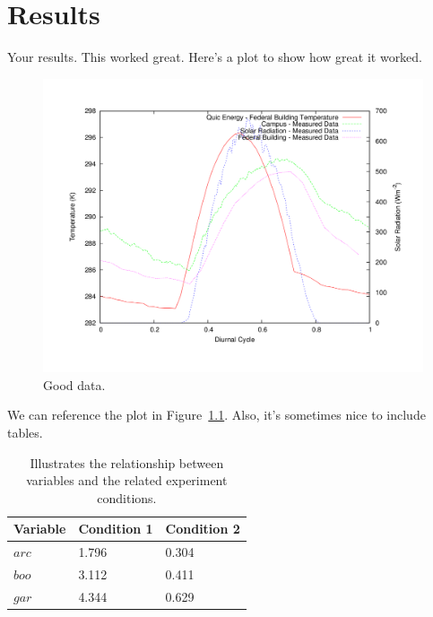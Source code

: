 \chapter{Results}
\label{chap:results}

Your results.  This worked great.  Here's a plot to show how great it worked.  


\begin{figure}
\centering
\includegraphics[width=0.8\linewidth]{images/goodData.png}
\caption{Good data.}
\label{fig:goodData}
\end{figure} 

We can reference the plot in Figure~\ref{fig:goodData}. Also, it's sometimes nice to include tables.

\begin{table}
\begin{center}
  \begin{tabular}{ | l | l | l | }
    \hline
    Variable & Condition 1 & Condition 2 \\ \hline
    \(arc\) & 1.796 & 0.304 \\ \hline 
    \(boo\) & 3.112 & 0.411 \\ \hline 
    \(gar\) & 4.344 & 0.629 \\ 
    \hline
  \end{tabular}
\end{center}
\caption{Illustrates the relationship between variables and the related experiment conditions.}
\label{tid:dataCond12}
\end{table}
